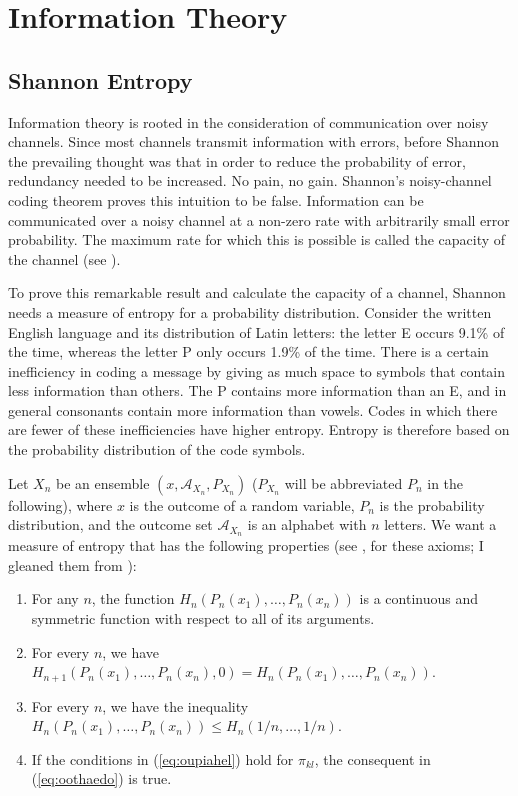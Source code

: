 \documentclass[phd,12pt,oneside]{ubcthesis}
\begin{document}
\section{Information Theory}
\label{sec:oxiequei}

\subsection{Shannon Entropy}
\label{subsec:thahcubu}

Information theory is rooted in the consideration of communication
over noisy channels. Since most channels transmit information with
errors, before Shannon the prevailing thought was that in order to
reduce the probability of error, redundancy needed to be increased. No
pain, no gain. Shannon's noisy-channel coding theorem proves this
intuition to be false. Information can be communicated over a noisy
channel at a non-zero rate with arbitrarily small error probability.
The maximum rate for which this is possible is called the capacity of
the channel (see ).

To prove this remarkable result and calculate the capacity of a
channel, Shannon needs a measure of entropy for a probability
distribution. Consider the written English language and its
distribution of Latin letters: the letter E occurs 9.1\% of the time,
whereas the letter P only occurs 1.9\% of the time. There is a certain
inefficiency in coding a message by giving as much space to symbols
that contain less information than others. The P contains more
information than an E, and in general consonants contain more
information than vowels. Codes in which there are fewer of these
inefficiencies have higher entropy. Entropy is therefore based on the
probability distribution of the code symbols. 

Let $X_{n}$ be an ensemble $(x,\mathcal{A}_{X_{n}},P_{X_{n}})$
($P_{X_{n}}$ will be abbreviated $P_{n}$ in the following), where $x$
is the outcome of a random variable, $P_{n}$ is the probability
distribution, and the outcome set $\mathcal{A}_{X_{n}}$ is an alphabet
with $n$ letters. We want a measure of entropy that has the following
properties (see , for these axioms; I gleaned
them from ):

\begin{enumerate}[(K1)]
\item For any $n$, the function
  $H_{n}(P_{n}(x_{1}),\ldots,P_{n}(x_{n}))$ is a continuous and
  symmetric function with respect to all of its arguments.
\item For every $n$, we have
  $H_{n+1}(P_{n}(x_{1}),\ldots,P_{n}(x_{n}),0)=H_{n}(P_{n}(x_{1}),\ldots,P_{n}(x_{n}))$.
\item For every $n$, we have the inequality
  $H_{n}(P_{n}(x_{1}),\ldots,P_{n}(x_{n}))\leq{}H_{n}(1/n,\dots,1/n)$.
\item If the conditions in (\ref{eq:oupiahel}) hold for $\pi_{kl}$, the consequent in
  (\ref{eq:oothaedo}) is true.
\end{enumerate}
\end{document}

